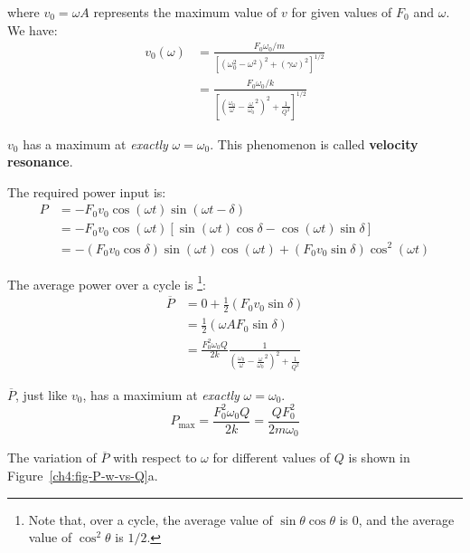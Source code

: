 where $v_0 = \omega A$ represents the maximum value of $v$ for given values of $F_0$ and $\omega$. We have:
\begin{align*}
v_0(\omega) 
&= \frac{F_0\omega_0/m}{[(\omega_0^2 - \omega^2)^2 + (\gamma\omega)^2]^{1/2}} \\
&= \frac{F_0\omega_0/k}{\left[(\frac{\omega_0}{\omega} - \frac{\omega}{\omega_0}^2)^2 + \frac{1}{Q^2} \right]^{1/2}}
\end{align*}

$v_0$ has a maximum at \emph{exactly} $\omega = \omega_0$. This phenomenon is called \textbf{velocity resonance}. 

The required power input is:
\begin{align*}
	P &= -F_0 v_0 \cos(\omega t) \sin(\omega t-\delta) \\
	&= -F_0 v_0 \cos(\omega t) [\sin(\omega t)\cos\delta - \cos(\omega t)\sin\delta] \\
	&= -(F_0 v_0 \cos\delta) \sin(\omega t) \cos(\omega t) + (F_0 v_0 \sin\delta) \cos^2(\omega t)
\end{align*}

The average power over a cycle is%
\footnote{Note that, over a cycle, the average value of $\sin\theta\cos\theta$ is $0$, and the average value of $\cos^2\theta$ is $1/2$.}:
\begin{align*}
	\overline{P}
	&= 0 + \frac{1}{2} (F_0 v_0 \sin\delta)  \\
	&= \frac{1}{2} (\omega A F_0 \sin\delta)  \\
	&= \frac{F_0^2 \omega_0 Q}{2k}
	\frac{1}{(\frac{\omega_0}{\omega} - \frac{\omega}{\omega_0}^2)^2 + \frac{1}{Q^2} }
\end{align*}

$\overline{P}$, just like $v_0$, has a maximium at \emph{exactly} $\omega = \omega_0$. 
\[ P_\text{max} = \frac{F_0^2\omega_0 Q}{2k} = \frac{QF_0^2}{2m\omega_0}\]

The variation of $\overline{P}$ with respect to $\omega$ for different values of $Q$ is shown in Figure~\ref{ch4:fig-P-w-vs-Q}a.

